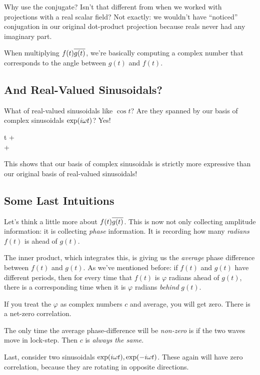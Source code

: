 \noindent
Why use the conjugate? Isn't that different from when we worked with
projections with a real scalar field? Not exactly: we wouldn't have
``noticed'' conjugation in our original dot-product projection because
reals never had any imaginary part.

When multiplying $f(t) \overline{g(t)}$, we're basically computing a complex
number that corresponds to the angle between $g(t)$ and $f(t)$.

\subsection{And Real-Valued Sinusoidals?}

What of real-valued sinusoidals like $\cos t$? Are they spanned by our
basis of complex sinusoidals $\exp\mathopen{}\left( {i\omega t} \right)\mathclose{}$? Yes!

\begin{nedqn}
  \cos \omega t
\eqcol
  \half {}
  +
  \half {}
\\\eqcol
  \half
  +
  \half
\\\eqcol
\end{nedqn}

This shows that our basis of complex sinusoidals is strictly more
expressive than our original basis of real-valued sinusoidals!

\subsection{Some Last Intuitions}

Let's think a little more about $f(t)\overline{g(t)}$. This is now not only
collecting amplitude information: it is collecting \emph{phase}
information. It is recording how many \emph{radians} $f(t)$ is ahead of
$g(t)$.

The inner product, which integrates this, is giving us the
\emph{average} phase difference between $f(t)$ and $g(t)$. As we've
mentioned before: if $f(t)$ and $g(t)$ have different periods, then for
every time that $f(t)$ is $\varphi$ radians ahead of $g(t)$, there is a
corresponding time when it is $\varphi$ radians \emph{behind} $g(t)$.

If you treat the $\varphi$ as complex numbers $c$ and average, you will
get zero. There is a net-zero correlation.

The only time the average phase-difference will be \emph{non-zero} is if
the two waves move in lock-step. Then $c$ is \emph{always the same}.

Last, consider two sinusoidals $\exp\mathopen{}\left( {i\omega t} \right)\mathclose{}, \exp\mathopen{}\left( {-i\omega t} \right)\mathclose{}$.
These again will have zero correlation, because they are rotating in
opposite directions.
